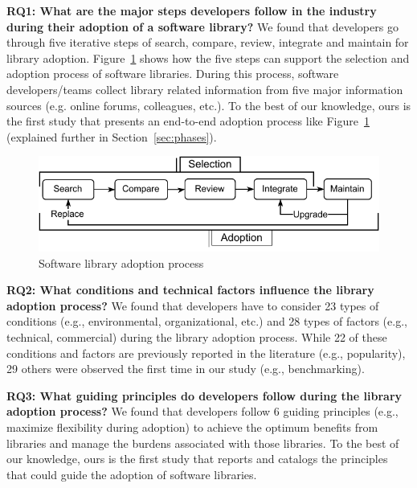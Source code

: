 \documentclass[sigconf,review,anonymous, table]{acmart}
\def\bf{\textbf}
\def\fig {Figure~}
\def\sec {Section~}
\newcommand{\nd}{\vspace{1mm}\noindent}
\begin{document}
\nd\bf{RQ1: What are the major steps developers follow in the industry during their adoption of a software library?} We found that developers go through five iterative steps of search, compare, review, integrate and maintain for library adoption. \fig\ref{fig:adoption-process} shows how the five steps can support the selection and adoption process of software libraries. During this process, software developers/teams collect library related information from five major information sources (e.g. online forums, colleagues, etc.). To the best of our knowledge, ours is the first study that presents an end-to-end adoption process like \fig\ref{fig:adoption-process} (explained further in \sec\ref{sec:phases}).
\begin{figure}[h]
    \centering
    \includegraphics[scale=.7]{images/adoption-process.pdf}
    \caption{Software library adoption process}
    \label{fig:adoption-process}
\end{figure}

\nd\bf{RQ2: What conditions and technical factors influence the library adoption process?}
We found that developers have to consider 23 types of conditions (e.g., environmental, organizational, etc.) and 28 types of factors (e.g., technical, commercial)  during the library adoption process. While 22 of these conditions and factors are previously reported in the literature  (e.g., popularity), 29 others were observed the first time in our study (e.g., benchmarking).

\nd\textbf{RQ3: What guiding principles do developers follow during the library adoption process?} We found that developers follow 6 guiding principles (e.g., maximize flexibility during adoption) to achieve the optimum benefits from libraries and manage the burdens associated with those libraries. To the best of our knowledge, ours is the first study that reports and catalogs the principles that could guide the adoption of software libraries.
\end{document}
